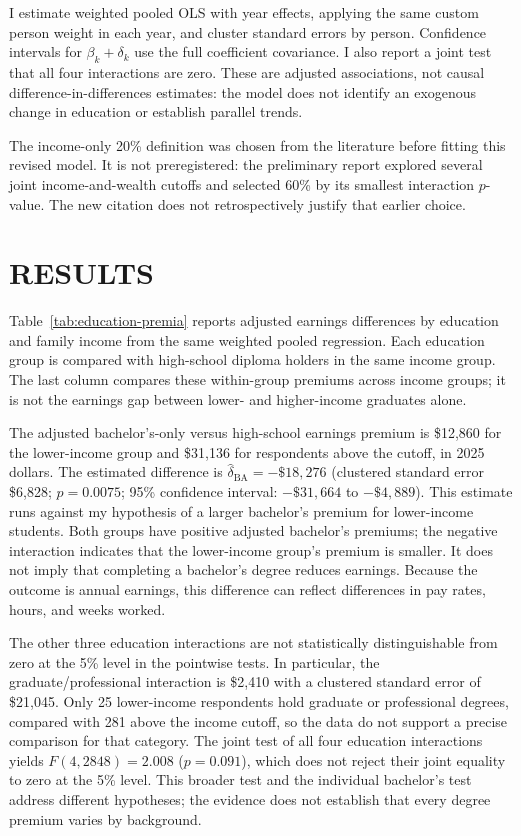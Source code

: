 \documentclass[12pt,letterpaper]{article}
\begin{document}
I estimate weighted pooled OLS with year effects, applying the same custom person
weight in each year, and cluster standard errors by person. Confidence intervals
for $\beta_k+\delta_k$ use the full coefficient covariance. I also report a joint
test that all four interactions are zero. These are adjusted associations, not
causal difference-in-differences estimates: the model does not identify an
exogenous change in education or establish parallel trends.

The income-only 20\% definition was chosen from the literature before fitting this
revised model. It is not preregistered: the preliminary report explored several
joint income-and-wealth cutoffs and selected 60\% by its smallest interaction
$p$-value. The new citation does not retrospectively justify that earlier choice.

\section*{RESULTS}
Table~\ref{tab:education-premia} reports adjusted earnings differences by education
and family income from the same weighted pooled regression. Each education group
is compared with high-school diploma holders in the same income group. The last
column compares these within-group premiums across income groups; it is not the
earnings gap between lower- and higher-income graduates alone.


The adjusted bachelor's-only versus high-school earnings premium is \$12,860 for
the lower-income group and \$31,136 for respondents above the cutoff, in 2025 dollars.
The estimated difference is $\hat\delta_{\mathrm{BA}}=-\$18,276$
(clustered standard error \$6,828; $p=0.0075$; 95\% confidence interval:
$-\$31,664$ to $-\$4,889$). This estimate runs against my hypothesis of a larger
bachelor's premium for lower-income students. Both groups have positive adjusted
bachelor's premiums; the negative interaction indicates that the lower-income
group's premium is smaller. It does not imply that completing a bachelor's degree
reduces earnings. Because the outcome is annual earnings, this difference can
reflect differences in pay rates, hours, and weeks worked.

The other three education interactions are not statistically distinguishable from
zero at the 5\% level in the pointwise tests. In particular, the graduate/professional
interaction is \$2,410 with a clustered standard error of \$21,045. Only 25
lower-income respondents hold graduate or professional degrees, compared with
281 above the income cutoff, so the data do not support a precise comparison for
that category. The joint test of all four education interactions yields
$F(4,2848)=2.008$ ($p=0.091$), which does not reject their joint equality to zero
at the 5\% level. This broader test and the individual bachelor's test address
different hypotheses; the evidence does not establish that every degree premium
varies by background.
\end{document}
